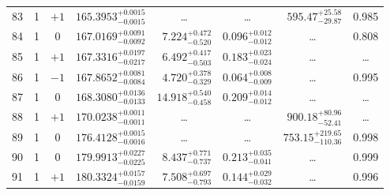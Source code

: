 \begin{table*}[!]
\begin{tabular}{llcrrlrc}
83 & 1 & $+1$ & $    165.3953_{-      0.0015}^{+      0.0015}$ & \multicolumn{1}{c}{\dots} & \multicolumn{1}{c}{\dots} & $      595.47_{-       29.87}^{+       25.58}$ & 0.985\\[1pt]
84 & 1 & 0 & $    167.0169_{-      0.0092}^{+      0.0091}$ & $       7.224_{-       0.520}^{+       0.472}$ & $       0.096_{-       0.012}^{+       0.012}$ & \multicolumn{1}{c}{\dots} & 0.808\\[1pt]
85 & 1 & $+1$ & $    167.3316_{-      0.0217}^{+      0.0197}$ & $       6.492_{-       0.503}^{+       0.417}$ & $       0.183_{-       0.024}^{+       0.023}$ & \multicolumn{1}{c}{\dots} & \dots \\[1pt]
86 & 1 & $-1$ & $    167.8652_{-      0.0084}^{+      0.0081}$ & $       4.720_{-       0.329}^{+       0.378}$ & $       0.064_{-       0.009}^{+       0.008}$ & \multicolumn{1}{c}{\dots} & 0.995\\[1pt]
87 & 1 & 0 & $    168.3080_{-      0.0133}^{+      0.0136}$ & $      14.918_{-       0.458}^{+       0.540}$ & $       0.209_{-       0.012}^{+       0.014}$ & \multicolumn{1}{c}{\dots} & \dots \\[1pt]
88 & 1 & $+1$ & $    170.0238_{-      0.0011}^{+      0.0011}$ & \multicolumn{1}{c}{\dots} & \multicolumn{1}{c}{\dots} & $      900.18_{-       52.41}^{+       80.96}$ & \dots \\[1pt]
 
89 & 1 & 0 & $    176.4128_{-      0.0016}^{+      0.0015}$ & \multicolumn{1}{c}{\dots} & \multicolumn{1}{c}{\dots} & $      753.15_{-      110.36}^{+      219.65}$ & 0.998 \\[1pt]
90 & 1 & 0 & $    179.9913_{-      0.0225}^{+      0.0227}$ & $       8.437_{-       0.737}^{+       0.771}$ & $       0.213_{-       0.041}^{+       0.035}$ & \multicolumn{1}{c}{\dots} & 0.999\\[1pt]
91 & 1 & $+1$ & $    180.3324_{-      0.0159}^{+      0.0157}$ & $       7.508_{-       0.793}^{+       0.697}$ & $       0.144_{-       0.032}^{+       0.029}$ & \multicolumn{1}{c}{\dots} & 0.996 \\[1pt]
\hline
\end{tabular}
\end{table*}



